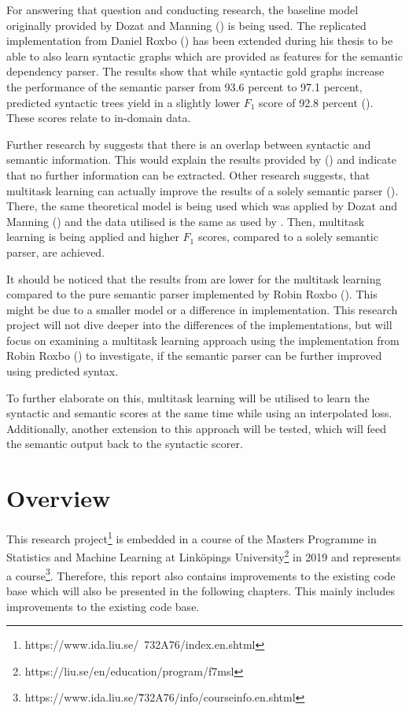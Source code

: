 \documentclass[11pt]{scrartcl}
\begin{document}
For answering that question and conducting research, the baseline model originally provided by Dozat and Manning (\cite{zeman-etal-2017-conll}) is being used. The replicated implementation from Daniel Roxbo (\cite{Roxbo1315439}) has been extended during his thesis to be able to also learn syntactic graphs which are provided as features for the semantic dependency parser. The results show that while syntactic gold graphs increase the performance of the semantic parser from 93.6 percent to 97.1 percent, predicted syntactic trees yield in a slightly lower $F_1$ score of 92.8 percent (\cite[p. 33]{Roxbo1315439}). These scores relate to in-domain data.

Further research by \cite{kurtz-etal-2019-improving} suggests that there is an overlap between syntactic and semantic information. This would explain the results provided by (\cite[p. 33]{Roxbo1315439}) and indicate that no further information can be extracted. Other research suggests, that multitask learning can actually improve the results of a solely semantic parser (\cite{peng-etal-2017-deep}). There, the same theoretical model is being used which was applied by Dozat and Manning (\cite{zeman-etal-2017-conll}) and the data utilised is the same as used by \cite{Roxbo1315439}. Then, multitask learning is being applied and higher $F_1$ scores, compared to a solely semantic parser, are achieved.

It should be noticed that the results from \cite{peng-etal-2017-deep} are lower for the multitask learning compared to the pure semantic parser implemented by Robin Roxbo (\cite{Roxbo1315439}). This might be due to a smaller model or a difference in implementation. This research project will not dive deeper into the differences of the implementations, but will focus on examining a multitask learning approach using the implementation from Robin Roxbo (\cite{Roxbo1315439}) to investigate, if the semantic parser can be further improved using predicted syntax.

To further elaborate on this, multitask learning will be utilised to learn the syntactic and semantic scores at the same time while using an interpolated loss. Additionally, another extension to this approach will be tested, which will feed the semantic output back to the syntactic scorer.

\section{Overview}

This research project\footnote{https://www.ida.liu.se/~732A76/index.en.shtml} is embedded in a course of the Masters Programme in Statistics and Machine Learning at Linköpings University\footnote{https://liu.se/en/education/program/f7msl} in 2019 and represents a course\footnote{https://www.ida.liu.se/\~732A76/info/courseinfo.en.shtml}. Therefore, this report also contains improvements to the existing code base which will also be presented in the following chapters. This mainly includes improvements to the existing code base.
\end{document}
